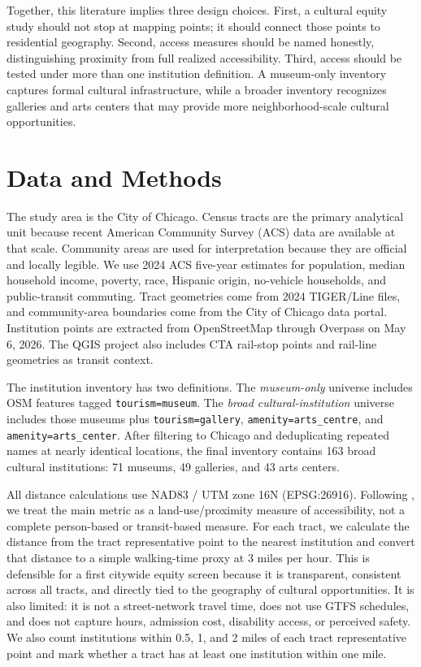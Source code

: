 \documentclass[11pt]{article}
\begin{document}
Together, this literature implies three design choices. First, a cultural equity study should not stop at mapping points; it should connect those points to residential geography. Second, access measures should be named honestly, distinguishing proximity from full realized accessibility. Third, access should be tested under more than one institution definition. A museum-only inventory captures formal cultural infrastructure, while a broader inventory recognizes galleries and arts centers that may provide more neighborhood-scale cultural opportunities.

\section{Data and Methods}

The study area is the City of Chicago. Census tracts are the primary analytical unit because recent American Community Survey (ACS) data are available at that scale. Community areas are used for interpretation because they are official and locally legible. We use 2024 ACS five-year estimates for population, median household income, poverty, race, Hispanic origin, no-vehicle households, and public-transit commuting. Tract geometries come from 2024 TIGER/Line files, and community-area boundaries come from the City of Chicago data portal. Institution points are extracted from OpenStreetMap through Overpass on May 6, 2026. The QGIS project also includes CTA rail-stop points and rail-line geometries as transit context.

The institution inventory has two definitions. The \textit{museum-only} universe includes OSM features tagged \texttt{tourism=museum}. The \textit{broad cultural-institution} universe includes those museums plus \texttt{tourism=gallery}, \texttt{amenity=arts\_centre}, and \texttt{amenity=arts\_center}. After filtering to Chicago and deduplicating repeated names at nearly identical locations, the final inventory contains 163 broad cultural institutions: 71 museums, 49 galleries, and 43 arts centers.

All distance calculations use NAD83 / UTM zone 16N (EPSG:26916). Following \citet{geurs2004}, we treat the main metric as a land-use/proximity measure of accessibility, not a complete person-based or transit-based measure. For each tract, we calculate the distance from the tract representative point to the nearest institution and convert that distance to a simple walking-time proxy at 3 miles per hour. This is defensible for a first citywide equity screen because it is transparent, consistent across all tracts, and directly tied to the geography of cultural opportunities. It is also limited: it is not a street-network travel time, does not use GTFS schedules, and does not capture hours, admission cost, disability access, or perceived safety. We also count institutions within 0.5, 1, and 2 miles of each tract representative point and mark whether a tract has at least one institution within one mile.
\end{document}
